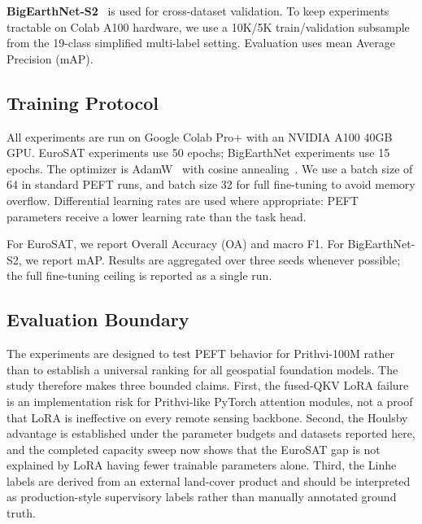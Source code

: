 \textbf{BigEarthNet-S2}~\cite{sumbul2019bigearthnet} is used for cross-dataset validation. To keep experiments tractable on Colab A100 hardware, we use a 10K/5K train/validation subsample from the 19-class simplified multi-label setting. Evaluation uses mean Average Precision (mAP).

\subsection{Training Protocol}
All experiments are run on Google Colab Pro+ with an NVIDIA A100 40GB GPU. EuroSAT experiments use 50 epochs; BigEarthNet experiments use 15 epochs. The optimizer is AdamW~\cite{loshchilov2019adamw} with cosine annealing~\cite{loshchilov2017sgdr}. We use a batch size of 64 in standard PEFT runs, and batch size 32 for full fine-tuning to avoid memory overflow. Differential learning rates are used where appropriate: PEFT parameters receive a lower learning rate than the task head.

For EuroSAT, we report Overall Accuracy (OA) and macro F1. For BigEarthNet-S2, we report mAP. Results are aggregated over three seeds whenever possible; the full fine-tuning ceiling is reported as a single run.

\subsection{Evaluation Boundary}
The experiments are designed to test PEFT behavior for Prithvi-100M rather than to establish a universal ranking for all geospatial foundation models. The study therefore makes three bounded claims. First, the fused-QKV LoRA failure is an implementation risk for Prithvi-like PyTorch attention modules, not a proof that LoRA is ineffective on every remote sensing backbone. Second, the Houlsby advantage is established under the parameter budgets and datasets reported here, and the completed capacity sweep now shows that the EuroSAT gap is not explained by LoRA having fewer trainable parameters alone. Third, the Linhe labels are derived from an external land-cover product and should be interpreted as production-style supervisory labels rather than manually annotated ground truth.

